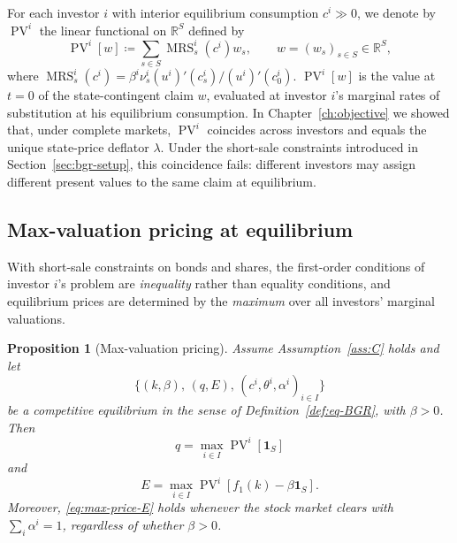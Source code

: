 \documentclass[11pt,a4paper,oneside]{book}
\def\R{\mathbb{R}}
\def\1{\mathbf{1}}
\DeclareMathOperator{\MRS}{MRS}
\DeclareMathOperator{\PV}{PV}
\theoremstyle{plain}
\newtheorem{proposition}[theorem]{Proposition}
\theoremstyle{definition}
\theoremstyle{remark}
\numberwithin{equation}{chapter}
\begin{document}
For each investor $i$ with interior equilibrium consumption $c^i \gg 0$, we denote by $\PV^i$ the linear functional on $\R^S$ defined by
\begin{equation}\label{eq:PV-def}
  \PV^i[w] \coloneqq \sum_{s \in S} \MRS^i_s(c^i) w_s,
  \qquad w = (w_s)_{s \in S} \in \R^S,
\end{equation}
where $\MRS^i_s(c^i) = \beta^i \nu^i_s (u^i)'(c^i_s) / (u^i)'(c^i_0)$.
$\PV^i[w]$ is the value at $t=0$ of the state-contingent claim $w$, evaluated at investor $i$'s marginal rates of substitution at his equilibrium consumption.
In Chapter~\ref{ch:objective} we showed that, under complete markets, $\PV^i$ coincides across investors and equals the unique state-price deflator $\lambda$.
Under the short-sale constraints introduced in Section~\ref{sec:bgr-setup}, this coincidence fails: different investors may assign different present values to the same claim at equilibrium.

\subsection{Max-valuation pricing at equilibrium}

With short-sale constraints on bonds and shares, the first-order conditions of investor $i$'s problem are \emph{inequality} rather than equality conditions, and equilibrium prices are determined by the \emph{maximum} over all investors' marginal valuations.

\begin{proposition}[Max-valuation pricing]\label{prop:max-pricing}
Assume Assumption~\ref{ass:C} holds and let
\begin{equation*}
  \bigl\{ (k, \beta), \, (q, E), \, (c^i, \theta^i, \alpha^i)_{i \in I} \bigr\}
\end{equation*}
be a competitive equilibrium in the sense of Definition~\ref{def:eq-BGR}, with $\beta > 0$.
Then
\begin{equation}\label{eq:max-price-q}
  q = \max_{i \in I} \PV^i[\1_S]
\end{equation}
and
\begin{equation}\label{eq:max-price-E}
  E = \max_{i \in I} \PV^i[f_1(k) - \beta \1_S].
\end{equation}
Moreover, \eqref{eq:max-price-E} holds whenever the stock market clears with $\sum_i \alpha^i = 1$, regardless of whether $\beta > 0$.
\end{proposition}
\end{document}
